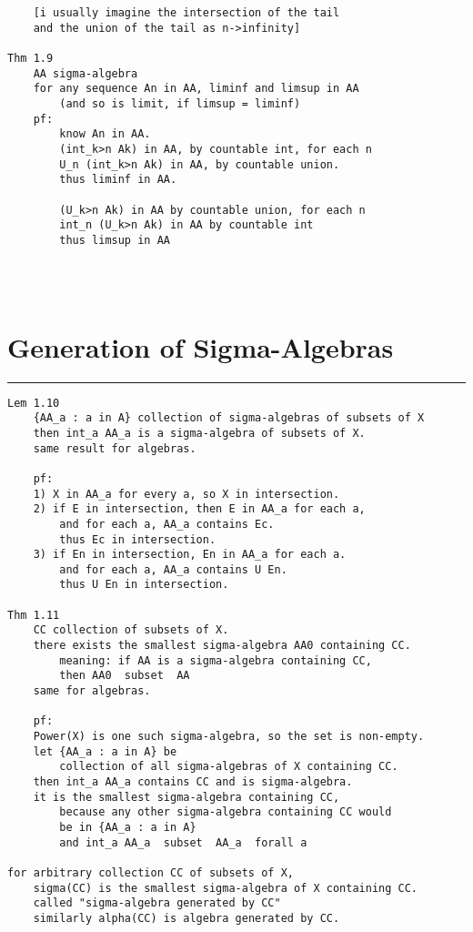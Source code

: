 \documentclass{article}
\begin{document}
\begin{flushleft}
\begin{verbatim}
    [i usually imagine the intersection of the tail
    and the union of the tail as n->infinity]

Thm 1.9
    AA sigma-algebra 
    for any sequence An in AA, liminf and limsup in AA 
        (and so is limit, if limsup = liminf)
    pf: 
        know An in AA. 
        (int_k>n Ak) in AA, by countable int, for each n 
        U_n (int_k>n Ak) in AA, by countable union. 
        thus liminf in AA. 

        (U_k>n Ak) in AA by countable union, for each n
        int_n (U_k>n Ak) in AA by countable int 
        thus limsup in AA 

        
        
\end{verbatim}

\section*{Generation of Sigma-Algebras}
\bigbreak
\hrule
\bigbreak

\begin{verbatim}
Lem 1.10
    {AA_a : a in A} collection of sigma-algebras of subsets of X 
    then int_a AA_a is a sigma-algebra of subsets of X. 
    same result for algebras. 

    pf:
    1) X in AA_a for every a, so X in intersection.  
    2) if E in intersection, then E in AA_a for each a, 
        and for each a, AA_a contains Ec. 
        thus Ec in intersection. 
    3) if En in intersection, En in AA_a for each a. 
        and for each a, AA_a contains U En. 
        thus U En in intersection. 

Thm 1.11
    CC collection of subsets of X. 
    there exists the smallest sigma-algebra AA0 containing CC. 
        meaning: if AA is a sigma-algebra containing CC,
        then AA0  subset  AA 
    same for algebras.

    pf: 
    Power(X) is one such sigma-algebra, so the set is non-empty.
    let {AA_a : a in A} be 
        collection of all sigma-algebras of X containing CC.
    then int_a AA_a contains CC and is sigma-algebra.
    it is the smallest sigma-algebra containing CC, 
        because any other sigma-algebra containing CC would 
        be in {AA_a : a in A}
        and int_a AA_a  subset  AA_a  forall a

for arbitrary collection CC of subsets of X, 
    sigma(CC) is the smallest sigma-algebra of X containing CC.
    called "sigma-algebra generated by CC"
    similarly alpha(CC) is algebra generated by CC.


\end{verbatim}
\end{flushleft}
\end{document}
